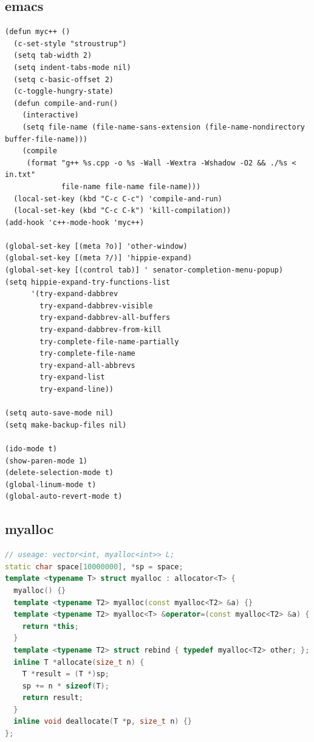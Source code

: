 \documentclass[twoside]{article}
\begin{document}
\subsection{emacs}
\begin{lstlisting}[language=elisp]
(defun myc++ ()
  (c-set-style "stroustrup")
  (setq tab-width 2)
  (setq indent-tabs-mode nil)
  (setq c-basic-offset 2)
  (c-toggle-hungry-state)
  (defun compile-and-run()
    (interactive)
    (setq file-name (file-name-sans-extension (file-name-nondirectory buffer-file-name)))
    (compile
     (format "g++ %s.cpp -o %s -Wall -Wextra -Wshadow -O2 && ./%s < in.txt"
             file-name file-name file-name)))
  (local-set-key (kbd "C-c C-c") 'compile-and-run)
  (local-set-key (kbd "C-c C-k") 'kill-compilation))
(add-hook 'c++-mode-hook 'myc++)

(global-set-key [(meta ?o)] 'other-window)
(global-set-key [(meta ?/)] 'hippie-expand)
(global-set-key [(control tab)] ' senator-completion-menu-popup)
(setq hippie-expand-try-functions-list
      '(try-expand-dabbrev
        try-expand-dabbrev-visible
        try-expand-dabbrev-all-buffers
        try-expand-dabbrev-from-kill
        try-complete-file-name-partially
        try-complete-file-name
        try-expand-all-abbrevs
        try-expand-list
        try-expand-line))

(setq auto-save-mode nil)
(setq make-backup-files nil)

(ido-mode t)
(show-paren-mode 1)
(delete-selection-mode t)
(global-linum-mode t)
(global-auto-revert-mode t)

\end{lstlisting}
\subsection{myalloc}
\begin{lstlisting}[language=c++]
// useage: vector<int, myalloc<int>> L;
static char space[10000000], *sp = space;
template <typename T> struct myalloc : allocator<T> {
  myalloc() {}
  template <typename T2> myalloc(const myalloc<T2> &a) {}
  template <typename T2> myalloc<T> &operator=(const myalloc<T2> &a) {
    return *this;
  }
  template <typename T2> struct rebind { typedef myalloc<T2> other; };
  inline T *allocate(size_t n) {
    T *result = (T *)sp;
    sp += n * sizeof(T);
    return result;
  }
  inline void deallocate(T *p, size_t n) {}
};

\end{lstlisting}
\end{document}

